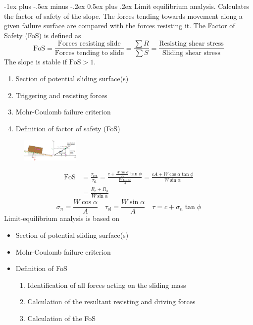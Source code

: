 \documentclass[10pt,landscape,a4paper]{article}
\makeatletter
\renewcommand{\section}{\@startsection{section}{1}{0mm}%
	{-1ex plus -.5ex minus -.2ex}%
	{0.5ex plus .2ex}%
	{\normalfont\large\bfseries}}
\makeatother
\begin{document}
\begin{multicols}{3}
		\section{Limit equilibrium analysis.}
		Calculates the factor of safety of the slope.
		The forces tending towards movement along a given failure surface are compared with the forces resisting it.
		The Factor of Safety (FoS) is defined as
		\[
			\text{FoS}=\frac{\text{Forces resisting slide}}{\text{Forces tending to slide}}=\frac{\sum R}{\sum S}=\frac{\text{Resisting shear stress}}{\text{Sliding shear stress}}
		\]
		The slope is stable if $\text{FoS}>1$.
		\begin{enumerate}
			\item Section of potential sliding surface(s)
			\item Triggering and resisting forces
			\item Mohr-Coulomb failure criterion
			\item Definition of factor of safety (FoS)
		\end{enumerate}
		\begin{figure}[H]
			\centering
			\includegraphics[width=0.25\textwidth]{limit-equilibrium-analysis}
		\end{figure}
		\begin{align*}
			\text{FoS}&=\frac{\tau_\text{res}}{\tau_\text{sl}}=\frac{c+\frac{W\cos\alpha}{A}\tan\phi}{\frac{W\sin\alpha}{A}}=\frac{cA+W\cos\alpha\tan\phi}{W\sin\alpha}\\
			&=\frac{R_c+R_\phi}{W\sin\alpha}
		\end{align*}
		\[
			\sigma_n=\frac{W\cos\alpha}{A}\quad\tau_\text{sl}=\frac{W\sin\alpha}{A}\quad\tau=c+\sigma_n\tan\phi
		\]
		Limit-equilibrium analysis is based on
		\begin{itemize}
			\item Section of potential sliding surface(s)
			\item Mohr-Coulomb failure criterion
			\item Definition of FoS
			\begin{enumerate}
				\item Identification of all forces acting on the sliding mass
				\item Calculation of the resultant resisting and driving forces
				\item Calculation of the FoS
			\end{enumerate}
		\end{itemize}
		

\end{multicols}
\end{document}
